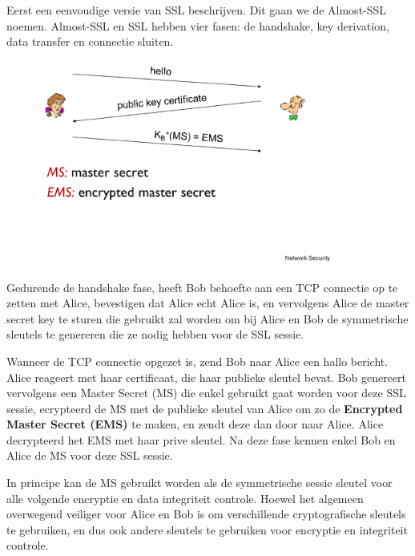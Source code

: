 \noindent Eerst een eenvoudige versie van SSL beschrijven. Dit gaan we de Almost-SSL noemen. Almost-SSL en SSL hebben vier fasen: de handshake, key derivation, data transfer en connectie sluiten.


\begin{figure}[h]
    \centering
    \includegraphics[width=4in]{./img/imghfdst8/hfdst8puntje28.png}
    \caption{ }      
    \label{fig: }
\end{figure}

\noindent Gedurende de handshake fase, heeft Bob behoefte aan een TCP connectie op te zetten met Alice, bevestigen dat Alice echt Alice is, en vervolgens Alice de master secret key te sturen die gebruikt zal worden om bij Alice en Bob de symmetrische sleutels te genereren die ze nodig hebben voor de SSL sessie.

\noindent Wanneer de TCP connectie opgezet is, zend Bob naar Alice een hallo bericht. Alice reageert met haar certificaat, die haar publieke sleutel bevat. Bob genereert vervolgens een Master Secret (MS) die enkel gebruikt gaat worden voor deze SSL sessie, ecrypteerd de MS met de publieke sleutel van Alice om zo de \textbf{Encrypted Master Secret (EMS)} te maken, en zendt deze dan door naar Alice. Alice decrypteerd het EMS met haar prive sleutel. Na deze fase kennen enkel Bob en Alice de MS voor deze SSL sessie.

\clearpage


\noindent In principe kan de MS gebruikt worden als de symmetrische sessie sleutel voor alle volgende encryptie en data integriteit controle. Hoewel het algemeen overwegend veiliger voor Alice en Bob is om verschillende cryptografische sleutels te gebruiken, en dus ook andere sleutels te gebruiken voor encryptie en integriteit controle. 

